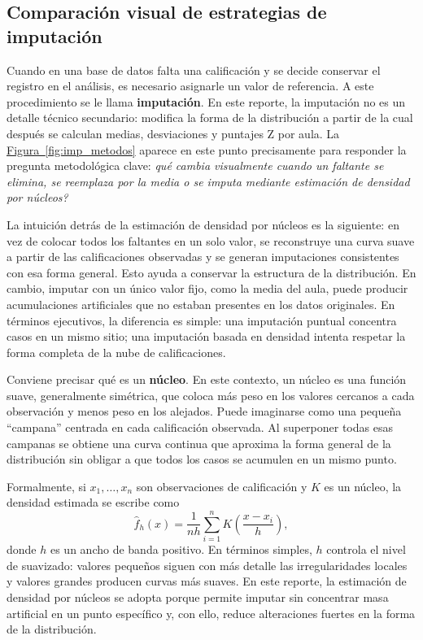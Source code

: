 \documentclass[10pt,letterpaper]{article} %
\numberwithin{figure}{subsection}
\begin{document}
\subsection{Comparación visual de estrategias de imputación}
Cuando en una base de datos falta una calificación y se decide conservar el registro en el análisis, es necesario asignarle un valor de referencia. A este procedimiento se le llama \textbf{imputación}. En este reporte, la imputación no es un detalle técnico secundario: modifica la forma de la distribución a partir de la cual después se calculan medias, desviaciones y puntajes Z por aula. La \hyperref[fig:imp_metodos]{Figura~\ref{fig:imp_metodos}} aparece en este punto precisamente para responder la pregunta metodológica clave: \emph{qué cambia visualmente cuando un faltante se elimina, se reemplaza por la media o se imputa mediante estimación de densidad por núcleos?}

La intuición detrás de la estimación de densidad por núcleos es la siguiente: en vez de colocar todos los faltantes en un solo valor, se reconstruye una curva suave a partir de las calificaciones observadas y se generan imputaciones consistentes con esa forma general. Esto ayuda a conservar la estructura de la distribución. En cambio, imputar con un único valor fijo, como la media del aula, puede producir acumulaciones artificiales que no estaban presentes en los datos originales. En términos ejecutivos, la diferencia es simple: una imputación puntual concentra casos en un mismo sitio; una imputación basada en densidad intenta respetar la forma completa de la nube de calificaciones.

Conviene precisar qué es un \textbf{núcleo}. En este contexto, un núcleo es una función suave, generalmente simétrica, que coloca más peso en los valores cercanos a cada observación y menos peso en los alejados. Puede imaginarse como una pequeña ``campana'' centrada en cada calificación observada. Al superponer todas esas campanas se obtiene una curva continua que aproxima la forma general de la distribución sin obligar a que todos los casos se acumulen en un mismo punto.

Formalmente, si $x_1,\dots,x_n$ son observaciones de calificación y $K$ es un núcleo, la densidad estimada se escribe como
\[
\hat f_h(x)=\frac{1}{nh}\sum_{i=1}^n K\!\left(\frac{x-x_i}{h}\right),
\]
donde $h$ es un ancho de banda positivo. En términos simples, $h$ controla el nivel de suavizado: valores pequeños siguen con más detalle las irregularidades locales y valores grandes producen curvas más suaves. En este reporte, la estimación de densidad por núcleos se adopta porque permite imputar sin concentrar masa artificial en un punto específico y, con ello, reduce alteraciones fuertes en la forma de la distribución.
\end{document}
